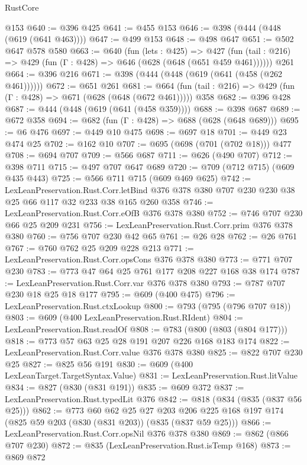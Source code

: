 \begin{lexlean}{RustCore}
\begin{coremodule}
    @153
@640 := @396 @425
@641 := @455 @153
@646 := @398 (@444 (@448 (@619 (@641 @463))))
@647 := @499 @153
@648 := @498 @647
@651 := @502 @647 @578 @580
@663 := @640
    (fun (lets : @425) =>
    @427 (fun (tail : @216) => @429 (fun (Γ : @428) => @646 (@628 (@648 (@651 @459 @461))))))
    @261
@664 := @396 @216
@671 := @398 (@444 (@448 (@619 (@641 (@458 (@262 @461))))))
@672 := @651 @261
@681 := @664 (fun (tail : @216) => @429 (fun (Γ : @428) => @671 (@628 (@648 (@672 @461))))) @358
@682 := @396 @428
@687 := @444 (@448 (@619 (@641 (@458 @359))))
@688 := @398 @687
@689 := @672 @358
@694 := @682 (fun (Γ : @428) => @688 (@628 (@648 @689)))
@695 := @6 @476
@697 := @449 @10 @475
@698 := @697 @18
@701 := @449 @23 @474 @25
@702 := @162 @10
@707 := @695 (@698 (@701 (@702 @18))) @477
@708 := @694 @707
@709 := @566 @687
@711 := @626 (@490 @707)
@712 := @398 @711
@715 := @497 @707 @647 @689
@720 := @709 (@712 @715) (@609 @435 @443)
@725 := @566 @711 @715 (@609 @469 @625)
@742 := LexLeanPreservation.Rust.Corr.letBind
    @376
    @378
    @380
    @707
    @230
    @230
    @38
    @25
    @66
    @117
    @32
    @233
    @38
    @165
    @260
    @358
@746 := LexLeanPreservation.Rust.Corr.eOfB @376 @378 @380
@752 := @746 @707 @230 @66 @25 @209 @231
@756 := LexLeanPreservation.Rust.Corr.prim @376 @378 @380
@760 := @756 @707 @230 @42 @65
@761 := @26 @28
@762 := @26 @761
@767 := @760 @762 @25 @209 @228 @213
@771 := LexLeanPreservation.Rust.Corr.opsCons @376 @378 @380
@773 := @771 @707 @230
@783 := @773 @47 @64 @25 @761 @177 @208 @227 @168 @38 @174
@787 := LexLeanPreservation.Rust.Corr.var @376 @378 @380
@793 := @787 @707 @230 @18 @25 @18 @177
@795 := @609 (@400 @475)
@796 := LexLeanPreservation.Rust.ctxLookup
@800 := @793 (@795 (@796 @707 @18))
@803 := @609 (@400 LexLeanPreservation.Rust.RIdent)
@804 := LexLeanPreservation.Rust.readOf
@808 := @783 (@800 (@803 (@804 @177)))
@818 := @773 @57 @63 @25 @28 @191 @207 @226 @168 @183 @174
@822 := LexLeanPreservation.Rust.Corr.value @376 @378 @380
@825 := @822 @707 @230 @25
@827 := @825 @56 @191
@830 := @609 (@400 LexLeanTarget.TargetSyntax.Value)
@831 := LexLeanPreservation.Rust.litValue
@834 := @827 (@830 (@831 @191))
@835 := @609 @372
@837 := LexLeanPreservation.Rust.typedLit @376
@842 := @818 (@834 (@835 (@837 @56 @25)))
@862 := @773
    @60
    @62
    @25
    @27
    @203
    @206
    @225
    @168
    @197
    @174
    (@825 @59 @203 (@830 (@831 @203)) (@835 (@837 @59 @25)))
@866 := LexLeanPreservation.Rust.Corr.opsNil @376 @378 @380
@869 := @862 (@866 @707 @230)
@872 := @835 (LexLeanPreservation.Rust.isTemp @168)
@873 := @869 @872

\end{coremodule}
\end{lexlean}
